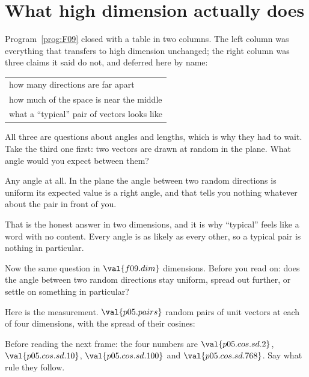 \section{What high dimension actually does}
\label{sec:P05-high-dimension}

\begin{fr}
Program~\ref{prog:F09} closed with a table in two columns. The left column was
everything that transfers to high dimension unchanged; the right column was
three claims it said do not, and deferred here by name:

\begin{center}
\begin{tabularx}{\linewidth}{@{}X@{}}
\toprule
how many directions are far apart \\
how much of the space is near the middle \\
what a \enquote{typical} pair of vectors looks like \\
\bottomrule
\end{tabularx}
\end{center}

All three are questions about angles and lengths, which is why they had to
wait. Take the third one first: two vectors are drawn at random in the plane.
What angle would you expect between them?
\nextframe
\end{fr}

\begin{fr}
\begin{ansblock}
Any angle at all. In the plane the angle between two random directions is
uniform \dash{} its expected value is a right angle, and that tells you nothing
whatever about the pair in front of you.
\end{ansblock}

That is the honest answer in two dimensions, and it is why \enquote{typical}
feels like a word with no content. Every angle is as likely as every other, so
a typical pair is nothing in particular.

Now the same question in $\val{f09.dim}$ dimensions. Before you read on: does
the angle between two random directions stay uniform, spread out further, or
settle on something in particular?
\dotline
\nextframe
\end{fr}

\begin{fr}
Here is the measurement. $\val{p05.pairs}$ random pairs of unit vectors at each
of four dimensions, with the spread of their cosines:


Before reading the next frame: the four numbers are $\val{p05.cos.sd.2}$,
$\val{p05.cos.sd.10}$, $\val{p05.cos.sd.100}$ and $\val{p05.cos.sd.768}$. Say
what rule they follow.
\dotline
\nextframe
\end{fr}

